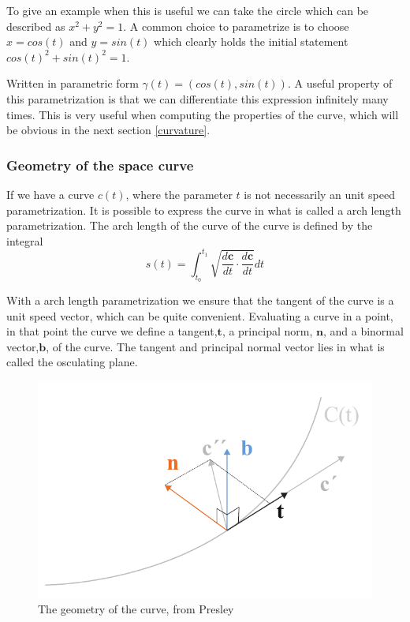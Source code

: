 \vspace{5mm} %

To give an example when this is useful we can take the circle which can be described as $x^2+y^2=1$. A common choice to parametrize is to choose $x = cos(t)$ and $y = sin(t)$ which clearly holds the initial statement $cos(t)^2 + sin(t)^2 = 1$.  

Written in parametric form $\gamma(t) = (cos(t),sin(t))$. A useful property of this parametrization is that we can differentiate this expression infinitely many times. This is very useful when computing the properties of the curve, which will be obvious in the next section \ref{curvature}.

\subsubsection{Geometry of the space curve} \label{GeoSpaceCurve}

If we have a curve $c(t)$, where the parameter $t$ is not necessarily an unit speed parametrization. It is possible to express the curve in what is called a arch length parametrization. The arch length of the curve of the curve is defined by the integral
\begin{equation}
s(t) = \int_{t_0}^{t_1} \sqrt{\frac{d\textbf{c}}{dt} \cdot \frac{d\textbf{c}}{dt}}dt
\end{equation}

With a arch length parametrization we ensure that the tangent of the curve is a unit speed vector, which can be quite convenient.
Evaluating a curve in a point, in that point the curve we define a tangent,$\textbf{t}$, a principal norm, $\textbf{n}$, and a binormal vector,$\textbf{b}$, of the curve. The tangent and principal normal vector lies in what is called the osculating plane.

\begin{figure}[H]
\centering
\includegraphics[width=0.7\linewidth ]{figure/Theory/CurveGeometry.pdf}              
\caption{The geometry of the curve, from Presley }
\end{figure}

